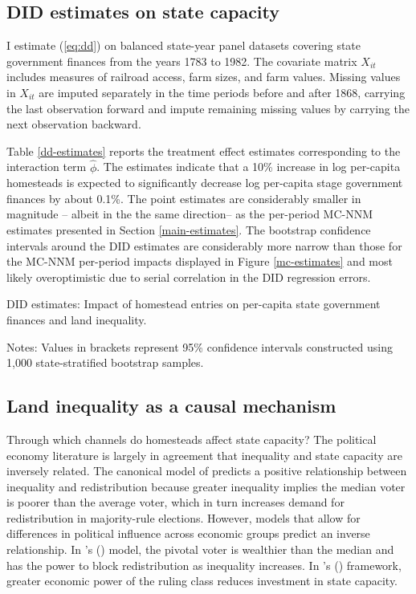 \documentclass[hidelinks,12pt]{article}
\newcommand{\possessivecite}[1]{\citeauthor{#1}'s (\citeyear{#1})}
\begin{document}
\subsection{DID estimates on state capacity}

I estimate (\ref{eq:dd}) on balanced state-year panel datasets covering state government finances from the years 1783 to 1982. The covariate matrix $X_{it}$ includes measures of railroad access, farm sizes, and farm values. Missing values in $X_{it}$ are imputed separately in the time periods before and after 1868, carrying the last observation forward and impute remaining missing values by carrying the next observation backward. 

Table \ref{dd-estimates} reports the treatment effect estimates corresponding to the interaction term $\hat{\phi}$. The estimates indicate that a 10\% increase in log per-capita homesteads is expected to significantly decrease log per-capita stage government finances by about 0.1\%. The point estimates are considerably smaller in magnitude -- albeit in the the same direction-- as the per-period MC-NNM estimates presented in Section \ref{main-estimates}. The bootstrap confidence intervals around the DID estimates are considerably more narrow than those for the MC-NNM per-period impacts displayed in Figure \ref{mc-estimates} and most likely overoptimistic due to serial correlation in the DID regression errors.

\begin{table}[htbp]
	\begin{center}
		\caption{DID estimates: Impact of homestead entries on per-capita state government finances and land inequality. \label{dd-estimates}}
		\resizebox{.8\width}{!}{}
	\end{center}
	\footnotesize{Notes: Values in brackets represent 95\% confidence intervals constructed using 1,000 state-stratified bootstrap samples.}
\end{table}

\subsection{Land inequality as a causal mechanism}  \label{mechanisms}

Through which channels do homesteads affect state capacity? The political economy literature is largely in agreement that inequality and state capacity are inversely related. The canonical model of \citet{meltzer1981rational} predicts a positive relationship between inequality and redistribution because greater inequality implies the median voter is poorer than the average voter, which in turn increases demand for redistribution in majority-rule elections. However, models that allow for differences in political influence across economic groups predict an inverse relationship. In \possessivecite{benabou2000unequal} model, the pivotal voter is wealthier than the median and has the power to block redistribution as inequality increases. In \possessivecite{besley2009origins} framework, greater economic power of the ruling class reduces investment in state capacity. 
\end{document}
